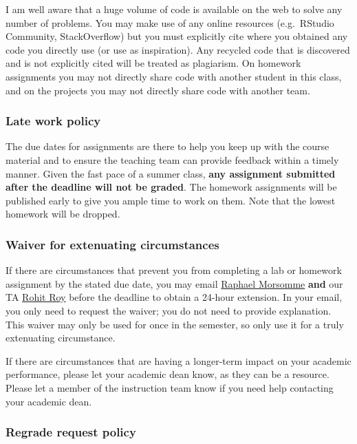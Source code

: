 \documentclass[
  letterpaper,
  DIV=11,
  numbers=noendperiod]{scrartcl}
\begin{document}
I am well aware that a huge volume of code is available on the web to
solve any number of problems. You may make use of any online resources
(e.g.~RStudio Community, StackOverflow) but you must explicitly cite
where you obtained any code you directly use (or use as inspiration).
Any recycled code that is discovered and is not explicitly cited will be
treated as plagiarism. On homework assignments you may not directly
share code with another student in this class, and on the projects you
may not directly share code with another team.

\hypertarget{late-work-policy}{%
\subsubsection{Late work policy}\label{late-work-policy}}

The due dates for assignments are there to help you keep up with the
course material and to ensure the teaching team can provide feedback
within a timely manner. Given the fast pace of a summer class,
\textbf{any assignment submitted after the deadline will not be graded}.
The homework assignments will be published early to give you ample time
to work on them. Note that the lowest homework will be dropped.

\hypertarget{waiver-for-extenuating-circumstances}{%
\subsubsection{Waiver for extenuating
circumstances}\label{waiver-for-extenuating-circumstances}}

If there are circumstances that prevent you from completing a lab or
homework assignment by the stated due date, you may email
\href{mailto:raphael.morsomme@duke.edu}{Raphael Morsomme} \textbf{and}
our TA \href{mailto:rohit.roy@duke.edu}{Rohit Roy} before the deadline
to obtain a 24-hour extension. In your email, you only need to request
the waiver; you do not need to provide explanation. This waiver may only
be used for once in the semester, so only use it for a truly extenuating
circumstance.

If there are circumstances that are having a longer-term impact on your
academic performance, please let your academic dean know, as they can be
a resource. Please let a member of the instruction team know if you need
help contacting your academic dean.

\hypertarget{regrade-request-policy}{%
\subsubsection{Regrade request policy}\label{regrade-request-policy}}
\end{document}
